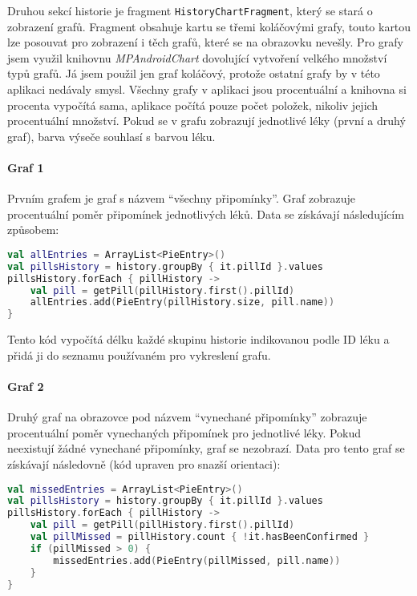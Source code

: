 \documentclass[../TakeYourPill.tex]{subfiles}
\begin{document}
Druhou sekcí historie je fragment \texttt{HistoryChartFragment}, který se stará o zobrazení grafů. Fragment obsahuje kartu se třemi koláčovými grafy, touto kartou lze posouvat pro zobrazení i těch grafů, které se na obrazovku nevešly. Pro grafy jsem využil knihovnu \textit{MPAndroidChart} \cite{chart} dovolující vytvoření velkého množství typů grafů. Já jsem použil jen graf koláčový, protože ostatní grafy by v této aplikaci nedávaly smysl. Všechny grafy v aplikaci jsou procentuální a knihovna si procenta vypočítá sama, aplikace počítá pouze počet položek, nikoliv jejich procentuální množství. Pokud se v grafu zobrazují jednotlivé léky (první a druhý graf), barva výseče souhlasí s barvou léku. 

\paragraph{Graf 1} Prvním grafem je graf s názvem \enquote{všechny připomínky}. Graf zobrazuje procentuální poměr připomínek jednotlivých léků. Data se získávají následujícím způsobem:

\begin{lstlisting}[language=Kotlin]
val allEntries = ArrayList<PieEntry>()
val pillsHistory = history.groupBy { it.pillId }.values
pillsHistory.forEach { pillHistory ->
    val pill = getPill(pillHistory.first().pillId)
    allEntries.add(PieEntry(pillHistory.size, pill.name))
}
\end{lstlisting}

Tento kód vypočítá délku každé skupinu historie indikovanou podle ID léku a přidá ji do seznamu používaném pro vykreslení grafu.


\paragraph{Graf 2} Druhý graf na obrazovce pod názvem \enquote{vynechané připomínky} zobrazuje procentuální poměr vynechaných připomínek pro jednotlivé léky. Pokud neexistují žádné vynechané připomínky, graf se nezobrazí. Data pro tento graf se získávají následovně (kód upraven pro snazší orientaci):

\begin{lstlisting}[language=Kotlin]
val missedEntries = ArrayList<PieEntry>()
val pillsHistory = history.groupBy { it.pillId }.values
pillsHistory.forEach { pillHistory ->
    val pill = getPill(pillHistory.first().pillId)
    val pillMissed = pillHistory.count { !it.hasBeenConfirmed }
    if (pillMissed > 0) {
        missedEntries.add(PieEntry(pillMissed, pill.name))
    }
}
\end{lstlisting}
\end{document}

